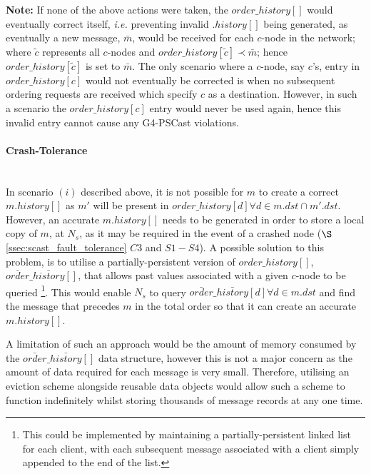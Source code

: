     \textbf{Note:} If none of the above actions were taken, the $order\_history[]$ would eventually correct itself, \emph{i.e.} preventing invalid $.history[]$ being generated, as eventually a new message, $\bar{m}$, would be received for each $c$-node in the network; where $\tilde{c}$ represents all $c$-nodes and $order\_history[\tilde{c}] \prec \bar{m}$; hence $order\_history[\tilde{c}]$ is set to $\bar{m}$.  The only scenario where a $c$-node, say $c$'s, entry in $order\_history[c]$ would not eventually be corrected is when no subsequent ordering requests are received which specify $c$ as a destination.  However, in such a scenario the $order\_history[c]$ entry would never be used again, hence this invalid entry cannot cause any G4-PSCast violations.  
    
    \paragraph{Crash-Tolerance} \hfill \\
    In scenario $(i)$ described above, it is not possible for $m$ to create a correct $m.history[]$ as $m'$ will be present in $order\_history[d] \forall d \in m.dst \cap m'.dst$.  However, an accurate $m.history[]$ needs to be generated in order to store a local copy of $m$, at $N_s$, as it may be required in the event of a crashed node ($\S$ \ref{ssec:scast_fault_tolerance} $C3$ and $S1-S4$).  A possible solution to this problem, is to utilise a partially-persistent version of $order\_history[]$, $\bar{order}\_\bar{history}[]$, that allows past values associated with a given $c$-node to be queried \footnote{This could be implemented by maintaining a partially-persistent linked list for each client, with each subsequent message associated with a client simply appended to the end of the list.}.  This would enable $N_s$ to query $\bar{order}\_\bar{history}[d] \forall d \in m.dst$ and find the message that precedes $m$ in the total order so that it can create an accurate $m.history[]$.
    
    A limitation of such an approach would be the amount of memory consumed by the $\bar{order}\_\bar{history}[]$ data structure, however this is not a major concern as the amount of data required for each message is very small.  Therefore, utilising an eviction scheme alongside reusable data objects would allow such a scheme to function indefinitely whilst storing thousands of message records at any one time.  

